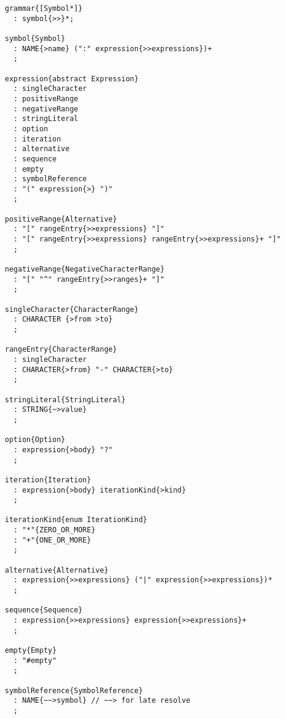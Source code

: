 \label{grammar-notation}

\begin{lstlisting}
grammar{[Symbol*]}
  : symbol{>>}*;

symbol{Symbol}
  : NAME{>name} (":" expression{>>expressions})+
  ;

expression{abstract Expression}
  : singleCharacter
  : positiveRange
  : negativeRange
  : stringLiteral
  : option
  : iteration
  : alternative
  : sequence
  : empty
  : symbolReference
  : "(" expression{>} ")"
  ;

positiveRange{Alternative}
  : "[" rangeEntry{>>expressions} "]"
  : "[" rangeEntry{>>expressions} rangeEntry{>>expressions}+ "]"
  ;

negativeRange{NegativeCharacterRange}
  : "[" "^" rangeEntry{>>ranges}+ "]"
  ;

singleCharacter{CharacterRange}
  : CHARACTER {>from >to}
  ;

rangeEntry{CharacterRange}
  : singleCharacter
  : CHARACTER{>from} "-" CHARACTER{>to}
  ;

stringLiteral{StringLiteral}
  : STRING{~>value}
  ;

option{Option}
  : expression{>body} "?"
  ;

iteration{Iteration}
  : expression{>body} iterationKind{>kind}
  ;

iterationKind{enum IterationKind}
  : "*"{ZERO_OR_MORE}
  : "+"{ONE_OR_MORE}
  ;

alternative{Alternative}
  : expression{>>expressions} ("|" expression{>>expressions})*
  ;

sequence{Sequence}
  : expression{>>expressions} expression{>>expressions}+
  ;

empty{Empty}
  : "#empty"
  ;

symbolReference{SymbolReference}
  : NAME{~~>symbol} // ~~> for late resolve
  ;
\end{lstlisting}